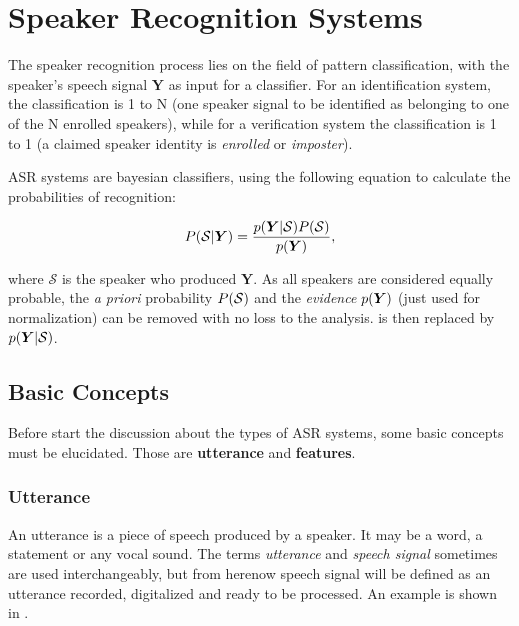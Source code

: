 \chapter{Speaker Recognition Systems}
\label{ch:speaker-recognition-systems}


The speaker recognition process lies on the field of pattern classification, with the speaker's speech signal $\boldsymbol{Y}$ as input for a classifier. For an identification system, the classification is 1 to N (one speaker signal to be identified as belonging to one of the N enrolled speakers), while for a verification system the classification is 1 to 1 (a claimed speaker identity is \emph{enrolled} or \emph{imposter}).

ASR systems are bayesian classifiers, using the following equation to calculate the probabilities of recognition:

\begin{equation}
    \postprob{\mathcal{S}}{\boldsymbol{Y}} = \frac{\postpdf{\boldsymbol{Y}}{\mathcal{S}} \prob{\mathcal{S}}}{\pdf{\boldsymbol{Y}}},
    \label{eq:bayes_equation}
\end{equation}

\noindent where $\mathcal{S}$ is the speaker who produced $\boldsymbol{Y}$. As all speakers are considered equally probable, the \emph{a priori} probability $P(\mathcal{S})$ and the \emph{evidence} $p(\boldsymbol{Y})$ (just used for normalization) can be removed with no loss to the analysis.  is then replaced by $p(\boldsymbol{Y}|\mathcal{S})$.

\section{Basic Concepts}
\label{sec:basic-concepts}

Before start the discussion about the types of ASR systems, some basic concepts must be elucidated. Those are \textbf{utterance} and \textbf{features}.

\subsection{Utterance}

An utterance is a piece of speech produced by a speaker. It may be a word, a statement or any vocal sound. The terms \emph{utterance} and \emph{speech signal} sometimes are used interchangeably, but from herenow speech signal will be defined as an utterance recorded, digitalized and ready to be processed. An example is shown in .


